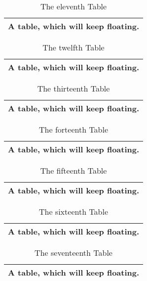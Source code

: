 \documentclass[british]{article}
\begin{document}
\begin{table}[t] \centering%
\begin{tabular}{|l|}
\hline
A table, which will keep floating.\\ \hline
\end{tabular}%
\caption{The eleventh Table}%
\end{table}%

\begin{table}[t] \centering%
\begin{tabular}{|l|}
\hline
A table, which will keep floating.\\ \hline
\end{tabular}%
\caption{The twelfth Table}%
\end{table}%

\begin{table}[t] \centering%
\begin{tabular}{|l|}
\hline
A table, which will keep floating.\\ \hline
\end{tabular}%
\caption{The thirteenth Table}%
\end{table}%

\begin{table}[t] \centering%
\begin{tabular}{|l|}
\hline
A table, which will keep floating.\\ \hline
\end{tabular}%
\caption{The forteenth Table}%
\end{table}%

\begin{table}[t] \centering%
\begin{tabular}{|l|}
\hline
A table, which will keep floating.\\ \hline
\end{tabular}%
\caption{The fifteenth Table}%
\end{table}%

\begin{table}[t] \centering%
\begin{tabular}{|l|}
\hline
A table, which will keep floating.\\ \hline
\end{tabular}%
\caption{The sixteenth Table}%
\end{table}%

\begin{table}[t] \centering%
\begin{tabular}{|l|}
\hline
A table, which will keep floating.\\ \hline
\end{tabular}%
\caption{The seventeenth Table}%
\end{table}%
\end{document}
